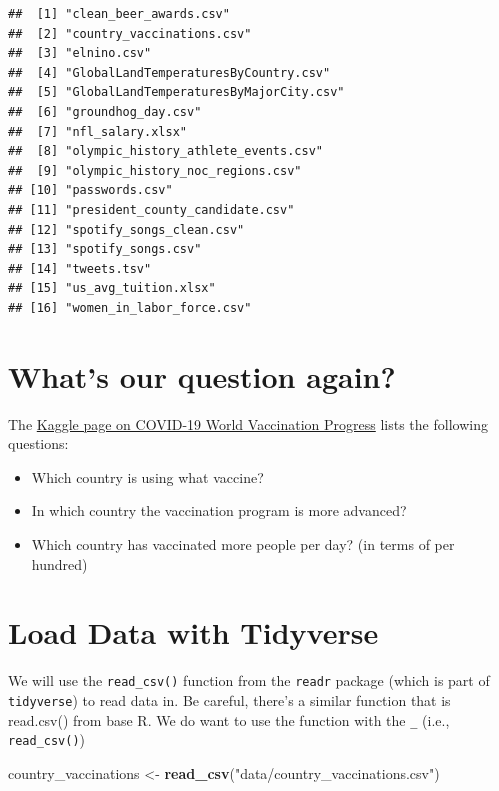 \documentclass[
]{book}
\newenvironment{Shaded}{\begin{snugshade}}{\end{snugshade}}
\newcommand{\KeywordTok}[1]{\textcolor[rgb]{0.13,0.29,0.53}{\textbf{#1}}}
\newcommand{\NormalTok}[1]{#1}
\newcommand{\StringTok}[1]{\textcolor[rgb]{0.31,0.60,0.02}{#1}}
\providecommand{\tightlist}{%
  \setlength{\itemsep}{0pt}\setlength{\parskip}{0pt}}
\begin{document}
\begin{verbatim}
##  [1] "clean_beer_awards.csv"                
##  [2] "country_vaccinations.csv"             
##  [3] "elnino.csv"                           
##  [4] "GlobalLandTemperaturesByCountry.csv"  
##  [5] "GlobalLandTemperaturesByMajorCity.csv"
##  [6] "groundhog_day.csv"                    
##  [7] "nfl_salary.xlsx"                      
##  [8] "olympic_history_athlete_events.csv"   
##  [9] "olympic_history_noc_regions.csv"      
## [10] "passwords.csv"                        
## [11] "president_county_candidate.csv"       
## [12] "spotify_songs_clean.csv"              
## [13] "spotify_songs.csv"                    
## [14] "tweets.tsv"                           
## [15] "us_avg_tuition.xlsx"                  
## [16] "women_in_labor_force.csv"
\end{verbatim}

\hypertarget{whats-our-question-again}{%
\section{What's our question again?}\label{whats-our-question-again}}

The \href{https://www.kaggle.com/gpreda/covid-world-vaccination-progress}{Kaggle page on COVID-19 World Vaccination Progress} lists the following questions:

\begin{itemize}
\tightlist
\item
  Which country is using what vaccine?
\item
  In which country the vaccination program is more advanced?
\item
  Which country has vaccinated more people per day? (in terms of per hundred)
\end{itemize}

\hypertarget{load-data-with-tidyverse}{%
\section{Load Data with Tidyverse}\label{load-data-with-tidyverse}}

We will use the \texttt{read\_csv()} function from the \texttt{readr} package (which is part of \texttt{tidyverse}) to read data in. Be careful, there's a similar function that is read.csv() from base R. We do want to use the function with the \texttt{\_} (i.e., \texttt{read\_csv()})

\begin{Shaded}
\begin{Highlighting}[]
\NormalTok{country_vaccinations <-}\StringTok{ }\KeywordTok{read_csv}\NormalTok{(}\StringTok{"data/country_vaccinations.csv"}\NormalTok{)}
\end{Highlighting}
\end{Shaded}
\end{document}
